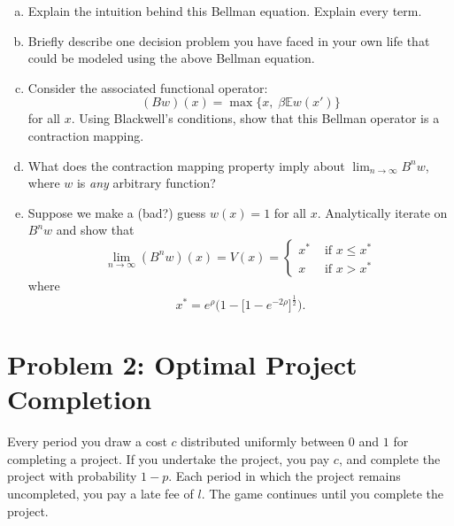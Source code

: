 \documentclass[11pt]{extarticle}
\theoremstyle{plain}
\theoremstyle{definition}
\begin{document}
\vspace{2mm}
\begin{enumerate}[(a)]
\item Explain the intuition behind this Bellman equation. Explain every term.

\item Briefly describe one decision problem you have faced in your own life that could be modeled using the above Bellman equation. 

\item Consider the associated functional operator:
\begin{equation*}
	(Bw)(x) = \max \bigg\{ x, \; \beta \mathbb E w(x') \bigg\}
\end{equation*}
for all $x$. Using Blackwell's conditions, show that this Bellman operator is a contraction mapping. 

\item What does the contraction mapping property imply about $\lim_{n \to \infty} B^n w$, where $w$ is \textit{any} arbitrary function? 

\item Suppose we make a (bad?) guess $w(x) = 1$ for all $x$. Analytically iterate on $B^n w$ and show that 
\begin{equation*}
	\lim_{n \to \infty} (B^n w) (x) = V(x) = \begin{cases}
		x^* & \text { if } x \leq x^* \\
		x & \text { if } x > x^*
	\end{cases}
\end{equation*}
where
\begin{equation*}
	x^* = e^\rho \bigg( 1 - \Big[ 1 - e^{- 2 \rho} \Big]^\frac{1}{2} \bigg).
\end{equation*}
\end{enumerate}



\vspace{5mm}
\section*{Problem 2: Optimal Project Completion}

Every period you draw a cost $c$ distributed uniformly between $0$ and $1$ for completing a project. If you undertake the project, you pay $c$, and complete the project with probability $1-p$. Each period in which the project remains uncompleted, you pay a late fee of $l$. The game continues until you complete the project.
\end{document}
